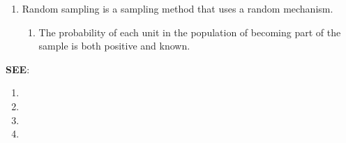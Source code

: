 \begin{enumerate}
\begin{enumerate}
        \item Random sampling is a sampling method that uses a random mechanism. 
        \hfill \cite{statistics/book/Statistics-for-Data-Scientists/Maurits-Kaptein}
    
        \begin{enumerate}
            \item The probability of each unit in the population of becoming part of the sample is both positive and known.
            \hfill \cite{statistics/book/Statistics-for-Data-Scientists/Maurits-Kaptein}
        \end{enumerate}
    \end{enumerate}

    \vspace{0.2cm}
    \textbf{SEE}:
    \begin{enumerate}
        \item {}
        \item {}
        \item {}
        \item {}
    \end{enumerate}
\end{enumerate}

\clearpage




\clearpage


\clearpage


\clearpage


\clearpage



\clearpage


















